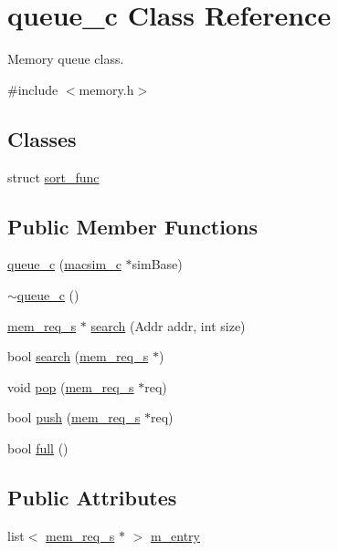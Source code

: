 \hypertarget{classqueue__c}{
\section{queue\_\-c Class Reference}
\label{classqueue__c}
}


Memory queue class.  




{\ttfamily \#include $<$memory.h$>$}

\subsection*{Classes}
\begin{DoxyCompactItemize}
\item 
struct \hyperlink{structqueue__c_1_1sort__func}{sort\_\-func}
\end{DoxyCompactItemize}
\subsection*{Public Member Functions}
\begin{DoxyCompactItemize}
\item 
\hyperlink{classqueue__c_a02d9781558887ca565e2220f5ad0dd1e}{queue\_\-c} (\hyperlink{classmacsim__c}{macsim\_\-c} $\ast$simBase)
\item 
\hyperlink{classqueue__c_aa8c5053bc2a1215d971e125df611fdec}{$\sim$queue\_\-c} ()
\item 
\hyperlink{structmem__req__s}{mem\_\-req\_\-s} $\ast$ \hyperlink{classqueue__c_a33bb120786468068cf200b46a62e8b71}{search} (Addr addr, int size)
\item 
bool \hyperlink{classqueue__c_a51a76ba5f32d444265d087ca9cb0be51}{search} (\hyperlink{structmem__req__s}{mem\_\-req\_\-s} $\ast$)
\item 
void \hyperlink{classqueue__c_a9f90cfdcfd0712922b4736ad15de3cd4}{pop} (\hyperlink{structmem__req__s}{mem\_\-req\_\-s} $\ast$req)
\item 
bool \hyperlink{classqueue__c_a5c0b0952291398c788d6ad78f58a16d2}{push} (\hyperlink{structmem__req__s}{mem\_\-req\_\-s} $\ast$req)
\item 
bool \hyperlink{classqueue__c_a4e7567848f61e7da0fc7e4f36f0645c8}{full} ()
\end{DoxyCompactItemize}
\subsection*{Public Attributes}
\begin{DoxyCompactItemize}
\item 
list$<$ \hyperlink{structmem__req__s}{mem\_\-req\_\-s} $\ast$ $>$ \hyperlink{classqueue__c_a5f34fb67fa005893ab60316d9b2f139a}{m\_\-entry}
\end{DoxyCompactItemize}
